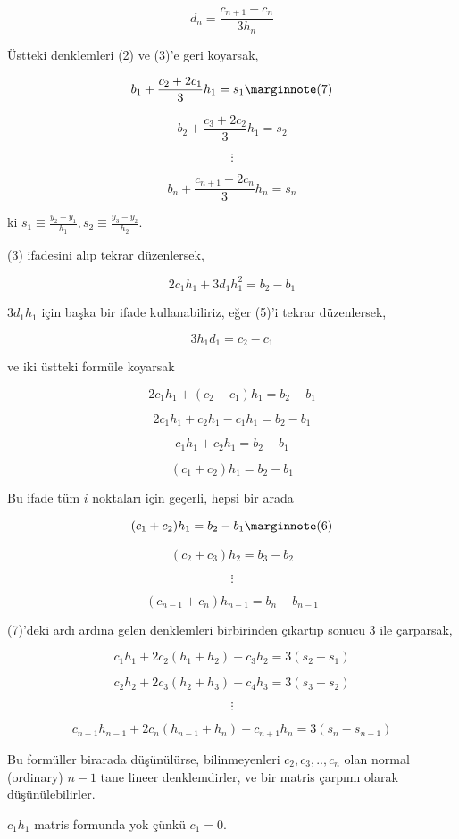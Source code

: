 \documentclass[12pt,fleqn]{article}\usepackage{../../common}
\begin{document}
$$ d_n = \frac{ c_{n+1} - c_n}{3h_n} $$

Üstteki denklemleri (2) ve (3)'e geri koyarsak,

$$ b_1 + \frac{ c_2 + 2c_1}{3}h_1 = s_1 
\mlabel{7} $$

$$ b_2 + \frac{ c_3 + 2c_2}{3}h_1 = s_2 $$

$$ \vdots $$

$$ b_n + \frac{ c_{n+1} + 2c_n}{3}h_n = s_n $$

ki $s_1 \equiv \frac{y_2 - y_1}{h_1}, s_2 \equiv \frac{y_3 - y_2}{h_2}$. 

(3) ifadesini alıp tekrar düzenlersek, 

$$  2c_1h_1 + 3d_1h_1^2  = b_2 - b_1$$

$3d_1h_1$ için başka bir ifade kullanabiliriz, eğer (5)'i tekrar
düzenlersek,

$$ 3h_1d_1 = c_2 - c_1$$

ve iki üstteki formüle koyarsak

$$  2c_1h_1 + (c_2 - c_1)h_1  = b_2 - b_1$$

$$  2c_1h_1 + c_2h_1 - c_1h_1  = b_2 - b_1$$

$$  c_1h_1 + c_2h_1  = b_2 - b_1$$

$$  (c_1 + c_2) h_1  = b_2 - b_1$$

Bu ifade tüm $i$ noktaları için geçerli, hepsi bir arada

$$  (c_1 + c_2) h_1  = b_2 - b_1 
\mlabel{6}$$

$$  (c_2 + c_3) h_2  = b_3 - b_2$$

$$ \vdots $$

$$  (c_{n-1} + c_n) h_{n-1}  = b_n - b_{n-1}$$

(7)'deki ardı ardına gelen denklemleri birbirinden çıkartıp sonucu 3 ile
çarparsak, 

$$ c_1h_1 + 2c_2(h_1 + h_2) + c_3h_2 = 3(s_2 - s_1) $$

$$ c_2h_2 + 2c_3(h_2 + h_3) + c_4h_3 = 3(s_3 - s_2) $$

$$ \vdots $$

$$ c_{n-1}h_{n-1} + 2c_n(h_{n-1} + h_{n}) + c_{n+1}h_n = 3(s_n - s_{n-1}) $$

Bu formüller birarada düşünülürse, bilinmeyenleri $c_2,c_3,..,c_n$ olan
normal (ordinary) $n-1$ tane lineer denklemdirler, ve bir matris çarpımı
olarak düşünülebilirler. 

$c_1h_1$ matris formunda yok çünkü $c_1=0$. 
\end{document}
